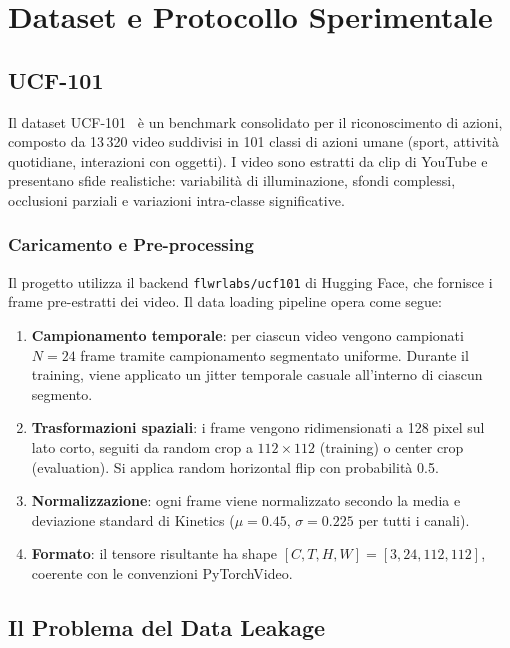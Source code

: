 \chapter{Dataset e Protocollo Sperimentale}
\label{chap:dataset}

\section{UCF-101}

Il dataset UCF-101~\cite{soomro2012ucf101} è un benchmark consolidato per il riconoscimento di azioni, composto da 13\,320 video suddivisi in 101 classi di azioni umane (sport, attività quotidiane, interazioni con oggetti). I video sono estratti da clip di YouTube e presentano sfide realistiche: variabilità di illuminazione, sfondi complessi, occlusioni parziali e variazioni intra-classe significative.

\subsection{Caricamento e Pre-processing}

Il progetto utilizza il backend \texttt{flwrlabs/ucf101} di Hugging Face, che fornisce i frame pre-estratti dei video. Il data loading pipeline opera come segue:

\begin{enumerate}
    \item \textbf{Campionamento temporale}: per ciascun video vengono campionati $N = 24$ frame tramite campionamento segmentato uniforme. Durante il training, viene applicato un jitter temporale casuale all'interno di ciascun segmento.
    \item \textbf{Trasformazioni spaziali}: i frame vengono ridimensionati a 128 pixel sul lato corto, seguiti da random crop a $112\times112$ (training) o center crop (evaluation). Si applica random horizontal flip con probabilità 0.5.
    \item \textbf{Normalizzazione}: ogni frame viene normalizzato secondo la media e deviazione standard di Kinetics ($\mu = 0.45$, $\sigma = 0.225$ per tutti i canali).
    \item \textbf{Formato}: il tensore risultante ha shape $[C, T, H, W] = [3, 24, 112, 112]$, coerente con le convenzioni PyTorchVideo.
\end{enumerate}

\section{Il Problema del Data Leakage}
\label{sec:data_leakage}

